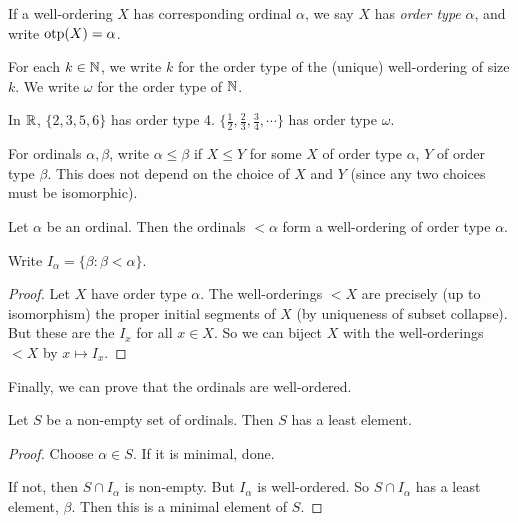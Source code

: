 \documentclass[a4paper]{article}
\begin{document}
\begin{defi}
  If a well-ordering $X$ has corresponding ordinal $\alpha$, we say $X$ has \emph{order type} $\alpha$, and write $\operatorname{otp}(X) = \alpha$.
\end{defi}

\begin{notation}
  For each $k\in \mathbb{N}$, we write $k$ for the order type of the (unique) well-ordering of size $k$. We write $\omega$ for the order type of $\mathbb{N}$.
\end{notation}

\begin{eg}
  In $\mathbb{R}$, $\{2, 3, 5 ,6\}$ has order type 4. $\{\frac{1}{2}, \frac{2}{3}, \frac{3}{4}, \cdots\}$ has order type $\omega$.
\end{eg}

\begin{notation}
  For ordinals $\alpha, \beta$, write $\alpha \leq \beta$ if $X\leq Y$ for some $X$ of order type $\alpha$, $Y$ of order type $\beta$. This does not depend on the choice of $X$ and $Y$ (since any two choices must be isomorphic).
\end{notation}

\begin{prop}
  Let $\alpha$ be an ordinal. Then the ordinals $<\alpha$ form a well-ordering of order type $\alpha$.
\end{prop}

\begin{notation}
  Write $I_\alpha = \{\beta: \beta < \alpha\}$.
\end{notation}

\begin{proof}
  Let $X$ have order type $\alpha$. The well-orderings $< X$ are precisely (up to isomorphism) the proper initial segments of $X$ (by uniqueness of subset collapse). But these are the $I_x$ for all $x\in X$. So we can biject $X$ with the well-orderings $< X$ by $x\mapsto I_x$.
\end{proof}

Finally, we can prove that the ordinals are well-ordered.
\begin{prop}
  Let $S$ be a non-empty set of ordinals. Then $S$ has a least element.
\end{prop}

\begin{proof}
  Choose $\alpha\in S$. If it is minimal, done.

  If not, then $S\cap I_\alpha$ is non-empty. But $I_\alpha$ is well-ordered. So $S\cap I_\alpha$ has a least element, $\beta$. Then this is a minimal element of $S$.
\end{proof}
\end{document}
